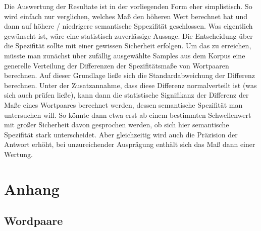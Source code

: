 \documentclass[11pt,numbers=noenddot]{scrartcl}
\begin{document}
Die Auswertung der Resultate ist in der vorliegenden Form eher simplistisch. So wird einfach nur verglichen, welches Maß den höheren Wert berechnet hat und dann auf höhere / niedrigere semantische Sppezifität geschlossen. Was eigentlich gewünscht ist, wäre eine statistisch zuverlässige Aussage. Die Entscheidung über die Spezifität sollte mit einer gewissen Sicherheit erfolgen. Um das zu erreichen, müsste man zunächst über zufällig ausgewählte Samples aus dem Korpus eine generelle Verteilung der Differenzen der Spezifitätsmaße von Wortpaaren berechnen. Auf dieser Grundlage ließe sich die Standardabweichung der Differenz berechnen. Unter der Zusatzannahme, dass diese Differenz normalverteilt ist (was sich auch prüfen ließe), kann dann die statistische Signifikanz der Differenz der Maße eines Wortpaares berechnet werden, dessen semantische Spezifität man untersuchen will. So könnte dann etwa erst ab einem bestimmten Schwellenwert mit großer Sicherheit davon gesprochen werden, ob sich hier semantische Spezifität stark unterscheidet. Aber gleichzeitig wird auch die Präzision der Antwort erhöht, bei unzureichender Ausprägung enthält sich das Maß dann einer Wertung.

\section{Anhang}

\subsection{Wordpaare}
\end{document}
